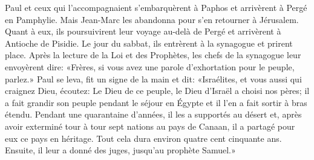 Paul et ceux qui l’accompagnaient s’embarquèrent à Paphos
	et arrivèrent à Pergé en Pamphylie.
	Mais Jean-Marc les abandonna pour s’en retourner à Jérusalem.
Quant à eux, ils poursuivirent leur voyage au-delà de Pergé
	et arrivèrent à Antioche de Pisidie.
Le jour du sabbat, ils entrèrent à la synagogue et prirent place.
Après la lecture de la Loi et des Prophètes,
	les chefs de la synagogue leur envoyèrent dire:
	«Frères, si vous avez une parole d’exhortation pour le peuple, parlez.»
Paul se leva, fit un signe de la main et dit:
	«Israélites, et vous aussi qui craignez Dieu, écoutez:
	Le Dieu de ce peuple, le Dieu d’Israël a choisi nos pères;
	il a fait grandir son peuple pendant le séjour en Égypte
	et il l’en a fait sortir à bras étendu.
Pendant une quarantaine d’années, il les a supportés au désert
	et, après avoir exterminé tour à tour sept nations au pays de Canaan,
	il a partagé pour eux ce pays en héritage.
Tout cela dura environ quatre cent cinquante ans.
	Ensuite, il leur a donné des juges, jusqu’au prophète Samuel.»
